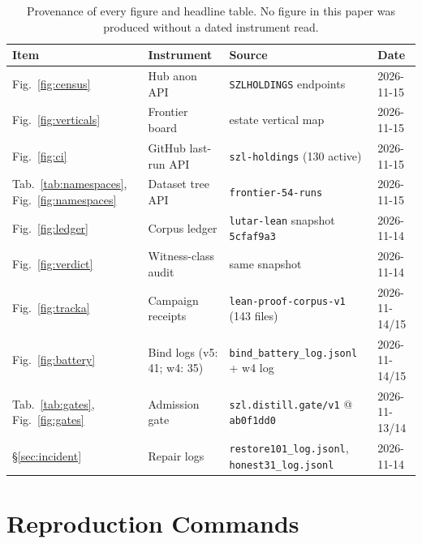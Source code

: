 \begin{table}[htbp]
\centering
\scriptsize
\begin{tabular}{llll}
\toprule
\textbf{Item} & \textbf{Instrument} & \textbf{Source} & \textbf{Date} \\
\midrule
Fig.~\ref{fig:census} & Hub anon API & \texttt{SZLHOLDINGS} endpoints & 2026-11-15 \\
Fig.~\ref{fig:verticals} & Frontier board & estate vertical map & 2026-11-15 \\
Fig.~\ref{fig:ci} & GitHub last-run API & \texttt{szl-holdings} (130 active) & 2026-11-15 \\
Tab.~\ref{tab:namespaces}, Fig.~\ref{fig:namespaces} & Dataset tree API & \texttt{frontier-54-runs} & 2026-11-15 \\
Fig.~\ref{fig:ledger} & Corpus ledger & \texttt{lutar-lean} snapshot \texttt{5cfaf9a3} & 2026-11-14 \\
Fig.~\ref{fig:verdict} & Witness-class audit & same snapshot & 2026-11-14 \\
Fig.~\ref{fig:tracka} & Campaign receipts & \texttt{lean-proof-corpus-v1} (143 files) & 2026-11-14/15 \\
Fig.~\ref{fig:battery} & Bind logs (v5: 41; w4: 35) & \texttt{bind\_battery\_log.jsonl} + w4 log & 2026-11-14/15 \\
Tab.~\ref{tab:gates}, Fig.~\ref{fig:gates} & Admission gate & \texttt{szl.distill.gate/v1} @ \texttt{ab0f1dd0} & 2026-11-13/14 \\
\S\ref{sec:incident} & Repair logs & \texttt{restore101\_log.jsonl}, \texttt{honest31\_log.jsonl} & 2026-11-14 \\
\bottomrule
\end{tabular}
\caption{Provenance of every figure and headline table. No figure in this paper was produced without a dated instrument read.}
\label{tab:provenance}
\end{table}

\section{Reproduction Commands}
\label{app:commands}

